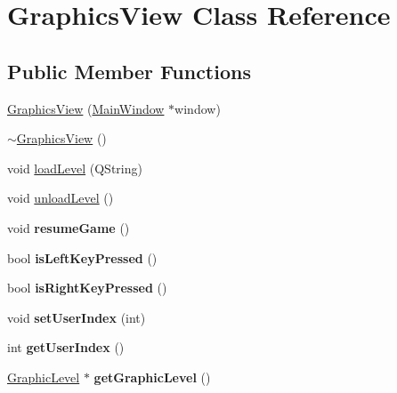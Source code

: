 \hypertarget{classGraphicsView}{
\section{GraphicsView Class Reference}
\label{classGraphicsView}
}
\subsection*{Public Member Functions}
\begin{DoxyCompactItemize}
\item 
\hyperlink{classGraphicsView_a434f91cc54ade82b589e384c6cfec165}{GraphicsView} (\hyperlink{classMainWindow}{MainWindow} $\ast$window)
\item 
\hyperlink{classGraphicsView_a367eed0f7fa5ab7b3cbc956f0d89d6d6}{$\sim$GraphicsView} ()
\item 
void \hyperlink{classGraphicsView_abe861e21e6239fca804bd7adf9bf5f3f}{loadLevel} (QString)
\item 
void \hyperlink{classGraphicsView_a3a2d02a72f584202daceec29afa9187e}{unloadLevel} ()
\item 
\hypertarget{classGraphicsView_a2b81138581782be77d7e224935148044}{
void {\bfseries resumeGame} ()}
\label{classGraphicsView_a2b81138581782be77d7e224935148044}

\item 
\hypertarget{classGraphicsView_a99ffbf826fe84df0280b1a4d9e3de069}{
bool {\bfseries isLeftKeyPressed} ()}
\label{classGraphicsView_a99ffbf826fe84df0280b1a4d9e3de069}

\item 
\hypertarget{classGraphicsView_a426a34a1e7a435e2a8f1beadf80f4cb5}{
bool {\bfseries isRightKeyPressed} ()}
\label{classGraphicsView_a426a34a1e7a435e2a8f1beadf80f4cb5}

\item 
\hypertarget{classGraphicsView_ab0917027a354893cf5d3104964a6c146}{
void {\bfseries setUserIndex} (int)}
\label{classGraphicsView_ab0917027a354893cf5d3104964a6c146}

\item 
\hypertarget{classGraphicsView_a70003d0742c00438f9f1a66df3e28d46}{
int {\bfseries getUserIndex} ()}
\label{classGraphicsView_a70003d0742c00438f9f1a66df3e28d46}

\item 
\hypertarget{classGraphicsView_aae3620999091a381db15118380206292}{
\hyperlink{classGraphicLevel}{GraphicLevel} $\ast$ {\bfseries getGraphicLevel} ()}
\label{classGraphicsView_aae3620999091a381db15118380206292}

\end{DoxyCompactItemize}
